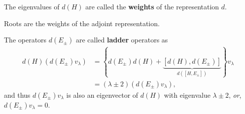 \begin{definition}
    The eigenvalues of $d \left( H \right) $ are called the \textbf{weights} of the representation $d$.
\end{definition}

\begin{note}
    Roots are the weights of the adjoint representation.
\end{note}

The operators $d\left( E_{\pm} \right) $ are called \textbf{ladder} operators as
\begin{align}
    d \left( H \right) \left( d\left( E_{\pm} \right) v_{\lambda} \right) &= \left\{ d \left( E_{\pm}  \right) d\left( H \right) + \underbrace{\left[ d\left( H \right) , d\left( E_{\pm} \right)  \right]}_{d \left( \left[ H, E_{\pm} \right]  \right) }  \right\} v_{\lambda} \\
    &= \left( \lambda \pm 2 \right) \left( d \left( E_{\pm} \right) v_{\lambda} \right) 
,\end{align}
and thus $d \left( E_{\pm} \right) v_{\lambda}$ is also an eigenvector of $d \left( H \right) $ with eigenvalue $\lambda \pm 2$, \textit{or}, $d \left( E_{\pm} \right) v_{\lambda} = 0$.
